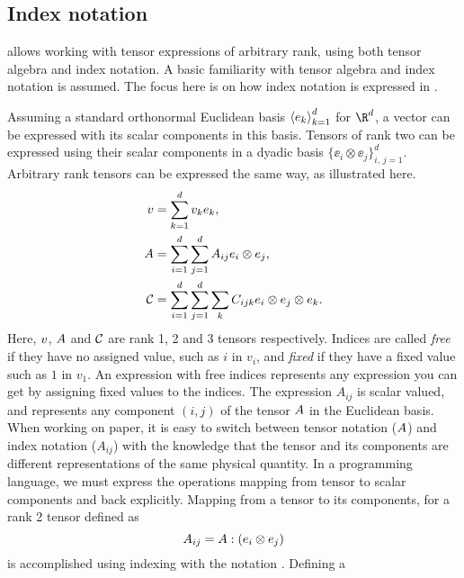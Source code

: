 \subsection{Index notation}
\label{ufl:sec:indexnotation}

\ufl{} allows working with tensor expressions of arbitrary rank, using
both tensor algebra and index notation.  A basic familiarity with tensor
algebra and index notation is assumed.  The focus here is on how index
notation is expressed in \ufl{}.

Assuming a standard orthonormal Euclidean basis $\seq{\ee_k}_{k=1}^d$
for $\R^d$, a vector can be expressed with its scalar components in
this basis.  Tensors of rank two can be expressed using their scalar
components in a dyadic basis $\{ \ee_i\otimes\ee_j \}_{i,\,j=1}^d$.
Arbitrary rank tensors can be expressed the same way, as illustrated here.
\begin{align}
\vv &= \sum_{k=1}^{d} v_k \ee_k,
\\
\AA &= \sum_{i=1}^{d} \sum_{j=1}^{d} A_{ij} \ee_i \otimes \ee_j,
\\
\Cc &= \sum_{i=1}^{d} \sum_{j=1}^{d} \sum_k C_{ijk} \ee_i \otimes \ee_j \otimes \ee_k.
\end{align}
Here, $\vv$, $\AA$ and $\Cc$ are rank 1, 2 and 3 tensors respectively.
Indices are called \emph{free} if they have no assigned value, such as
$i$ in $v_i$, and \emph{fixed} if they have a fixed value such as $1$ in
$v_1$. An expression with free indices represents any expression you can
get by assigning fixed values to the indices.  The expression $A_{ij}$ is
scalar valued, and represents any component $(i,j)$ of the tensor $\AA$ in
the Euclidean basis.  When working on paper, it is easy to switch between
tensor notation ($\AA$) and index notation ($A_{ij}$) with the knowledge
that the tensor and its components are different representations of the
same physical quantity.  In a programming language, we must express the
operations mapping from tensor to scalar components and back explicitly.
Mapping from a tensor to its components, for a rank 2 tensor defined as
\begin{equation}
A_{ij} = \AA : (\ee_i\otimes\ee_j)
\end{equation}
is accomplished using indexing with the notation .  Defining a
